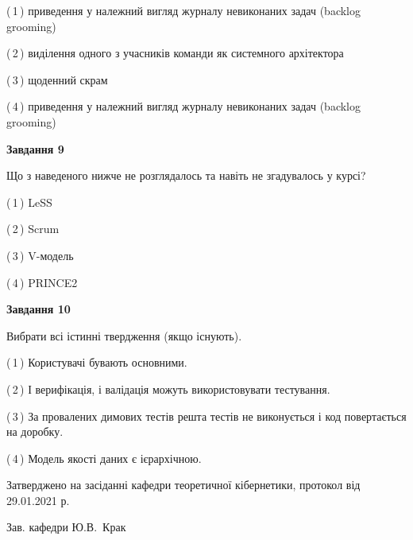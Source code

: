 \documentclass[10pt, ukrainian]{article}
\begin{document}
{\begin {large}
(\,1\,) приведення у належний вигляд журналу невиконаних задач (backlog grooming) %



(\,2\,) виділення одного з учасників команди як системного архітектора%



(\,3\,) щоденний скрам%



(\,4\,) приведення у належний вигляд журналу невиконаних задач (backlog grooming) %


{\begin {center}\textbf{Завдання 9}\end {center}}\par
Що з наведеного нижче не розглядалось та навіть не згадувалось у курсі?\par
\vspace{2mm}



(\,1\,) LeSS%



(\,2\,) Scrum%



(\,3\,) V-модель%



(\,4\,) PRINCE2%


{\begin {center}\textbf{Завдання 10}\end {center}}\par
Вибрати всі істинні твердження (якщо існують).\par
\vspace{2mm}



(\,1\,) Користувачі бувають основними.%



(\,2\,) І верифікація, і валідація можуть використовувати тестування.%



(\,3\,) За провалених димових тестів решта тестів не виконується і код повертається на доробку.%



(\,4\,) Модель якості даних є ієрархічною.%



\end {large}}
{\vspace{5mm}\smallskip \begin {small} Затверджено на засіданні кафедри теоретичної кібернетики, протокол  від   29.01.2021 р.\par\smallskip\smallskip
{\parbox {6.5 cm}{Зав. кафедри \dotfill Ю.В.~Крак}} \end{small}}
\newpage
\end{document}
